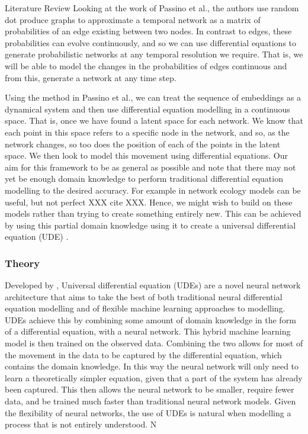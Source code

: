 \documentclass[12pt]{amsart}
\begin{document}
\begin{section}{Literature Review}
        Looking at the work of Passino et al.\cite{sanna2021link}, the authors use random dot produce graphs\cite{athreya2017statistical} to approximate a temporal network as a matrix of probabilities of an edge existing between two nodes. In contrast to edges, these probabilities can evolve continuously, and so we can use differential equations to generate probabilistic networks at any temporal resolution we require. That is, we will be able to model the changes in the probabilities of edges continuous and from this, generate a network at any time step.

        Using the method in Passino et al.\cite{sanna2021link}, we can treat the sequence of embeddings as a dynamical system and then use differential equation modelling in a continuous space. That is, once we have found a latent space for each network. We know that each point in this space refers to a specific node in the network, and so, as the network changes, so too does the position of each of the points in the latent space. We then look to model this movement using differential equations. Our aim for this framework to be as general as possible and note that there may not yet be enough domain knowledge to perform traditional differential equation modelling to the desired accuracy. For example in network ecology models can be useful, but not perfect XXX cite XXX. Hence, we might wish to build on these models rather than trying to create something entirely new. This can be achieved by using this partial domain knowledge using it to create a universal differential equation (UDE) \cite{SciML_C_Rak}.

        \subsubsection{Theory}
            Developed by \cite{SciML_C_Rak}, Universal differential equation (UDEs) are a novel neural network architecture that aims to take the best of both traditional neural differential equation modelling and of flexible machine learning approaches to modelling. UDEs achieve this by combining some amount of domain knowledge in the form of a differential equation, with a neural network. This hybrid machine learning model is then trained on the observed data. Combining the two allows for most of the movement in the data to be captured by the differential equation, which contains the domain knowledge. In this way the neural network will only need to learn a theoretically simpler equation, given that a part of the system has already been captured. This then allows the neural network to be smaller, require fewer data, and be trained much faster than traditional neural network models. Given the flexibility of neural networks, the use of UDEs is natural when modelling a process that is not entirely understood\cite{kidger2022neural}. N
            

\end{section}
\end{document}

